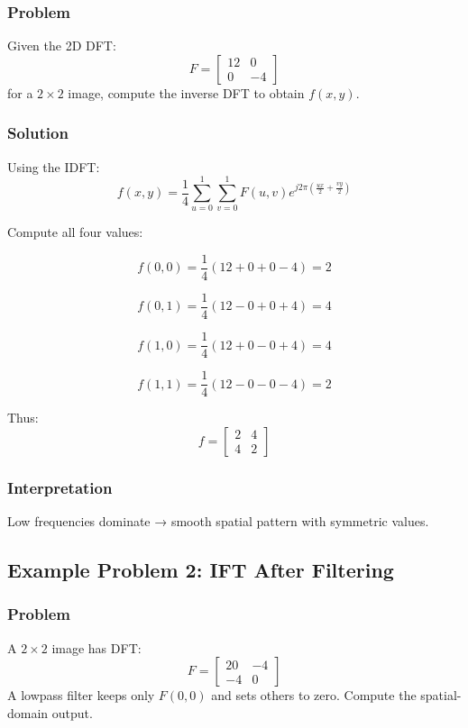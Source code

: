\documentclass{AnantDocumentation}
\begin{document}
\subsubsection*{Problem}

Given the 2D DFT:
\[
F =
\begin{bmatrix}
12 & 0\\
0 & -4
\end{bmatrix}
\]
for a $2\times2$ image, compute the inverse DFT to obtain $f(x,y)$.

\subsubsection*{Solution}

Using the IDFT:
\[
f(x,y) = \frac{1}{4}
\sum_{u=0}^{1}\sum_{v=0}^{1}
F(u,v)e^{j2\pi\left(\frac{ux}{2} + \frac{vy}{2}\right)}
\]

Compute all four values:

\[
f(0,0) = \frac{1}{4}(12 + 0 + 0 - 4) = 2
\]

\[
f(0,1) = \frac{1}{4}(12 - 0 + 0 + 4) = 4
\]

\[
f(1,0) = \frac{1}{4}(12 + 0 - 0 + 4) = 4
\]

\[
f(1,1) = \frac{1}{4}(12 - 0 - 0 - 4) = 2
\]

Thus:
\[
f =
\begin{bmatrix}
2 & 4\\
4 & 2
\end{bmatrix}
\]

\subsubsection*{Interpretation}
Low frequencies dominate → smooth spatial pattern with symmetric values.

\subsection{Example Problem 2: IFT After Filtering}

\subsubsection*{Problem}
A $2\times2$ image has DFT:
\[
F =
\begin{bmatrix}
20 & -4\\
-4 & 0
\end{bmatrix}
\]
A lowpass filter keeps only $F(0,0)$ and sets others to zero.  
Compute the spatial-domain output.
\end{document}
